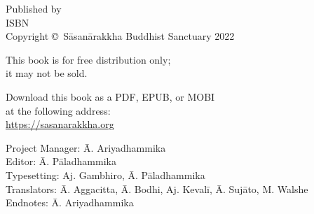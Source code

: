 
\cleartoverso
\thispagestyle{empty}

\vspace*{-\baselineskip}

{%

  \ifafiveversion \fontsize{10}{16}\selectfont \fi
  \ifasixversion \fontsize{7.5}{11}\selectfont \fi
  \centering
  \setlength{\parindent}{0pt}%

  \ifafiveversion \vspace{0.5cm} \fi

  Published by \publisher\\
  ISBN \theISBN\\
  Copyright \copyright\ Sāsanārakkha Buddhist Sanctuary 2022

  \ifafiveversion \vspace{0.5cm} \fi
  \ifasixversion \vspace{0.4cm} \fi

  This book is for free distribution only;\\
  it may not be sold.


  \ifafiveversion \vspace{0.5cm} \fi
  \ifasixversion \vspace{0.4cm} \fi

  Download this book as a PDF, EPUB, or MOBI\\
  at the following address:\\
  \href{https://sasanarakkha.org/}{https://sasanarakkha.org}

  \ifafiveversion \vspace{0.5cm} \fi
  \ifasixversion \vspace{0.4cm} \fi

  Project Manager: Ā. Ariyadhammika\\
  Editor: Ā. Pāladhammika\\
  Typesetting: Aj. Gambhiro, Ā. Pāladhammika\\
  Translators: Ā. Aggacitta, Ā. Bodhi, Aj. Kevalī, Ā. Sujāto, M. Walshe\\
  Endnotes: Ā. Ariyadhammika

  \ifafiveversion \vspace{0.5cm} \fi
  \ifasixversion \vspace{0.4cm} \fi

}
